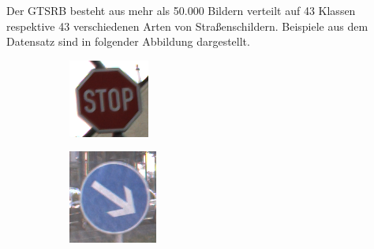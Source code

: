 Der \ac{GTSRB} besteht aus mehr als 50.000 Bildern verteilt auf 43 Klassen respektive 43 verschiedenen Arten von Straßenschildern. Beispiele aus dem Datensatz sind in folgender Abbildung dargestellt. \cite{GTSRB}
\begin{figure}[H]
   \centering
   \begin{subfigure}[b]{0.125\textwidth}
       \centering
       \includegraphics[height=\textwidth]{../images/GTSRB/00093.png}
       \caption{}
       \label{fig:gtrsb-paper-bsp-image-1}
   \end{subfigure}
   \hspace{3em}%
   \begin{subfigure}[b]{0.125\textwidth}
       \centering
       \includegraphics[height=\textwidth]{../images/GTSRB/00847.png}

\end{subfigure}
\end{figure}

